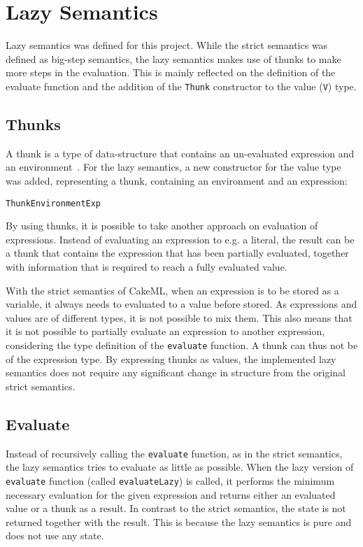 \chapter{Lazy Semantics}
\label{LazySem}
Lazy semantics was defined for this project.
While the strict semantics was defined as big-step semantics, the lazy semantics
makes use of thunks to make more steps in the evaluation.
This is mainly reflected on the definition of the evaluate function
and the addition of the \texttt{Thunk} constructor to the value (\texttt{V})
type.

\section{Thunks}
A thunk is a type of data-structure that contains an un-evaluated expression
and an environment~\cite{Takano:2015:TRL:2695664.2695693}.
For the lazy semantics, a new constructor for the value type was added,
representing a thunk, containing an environment and an expression:
\begin{alltt}
Thunk Environment Exp
\end{alltt}
By using thunks, it is possible to take another approach on evaluation of
expressions. Instead of evaluating an expression to e.g. a literal, the
result can be a thunk that contains the expression that has been partially
evaluated, together with information that is required to reach a fully evaluated
value.

With the strict semantics of CakeML, when an expression is to be stored as a
variable, it always needs to evaluated to a value before stored.
As expressions and values are of different types, it is not possible to mix
them. This also means that it is not possible to partially evaluate an
expression to another expression, considering the type definition of the
\texttt{evaluate} function. A thunk can thus not be of the expression type.
By expressing thunks as values, the implemented lazy semantics does not require
any significant change in structure from the original strict semantics. 

\section{Evaluate}
\label{Eval}
Instead of recursively calling the \texttt{evaluate} function, as
in the strict semantics, the lazy semantics tries to evaluate as little as possible.
When the lazy version of \texttt{evaluate} function (called
\texttt{evaluateLazy}) is called, it performs the minimum necessary evaluation
for the given expression and returns either an evaluated value or a thunk as a result.
In contrast to the strict semantics, the state is not returned together with the
result. This is because the lazy semantics is pure and does not use any state.

